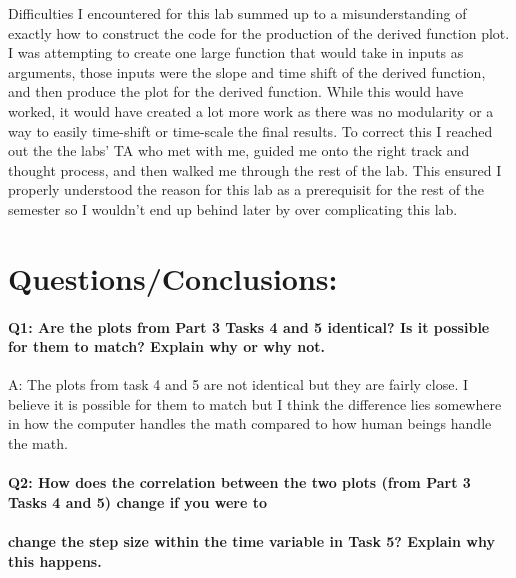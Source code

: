 \documentclass[11pt]{article}
\begin{document}
Difficulties I encountered for this lab summed up to a misunderstanding
of exactly how to construct the code for the production of the derived
function plot. I was attempting to create one large function that would
take in inputs as arguments, those inputs were the slope and time shift
of the derived function, and then produce the plot for the derived
function. While this would have worked, it would have created a lot more
work as there was no modularity or a way to easily time-shift or
time-scale the final results. To correct this I reached out the the
labs' TA who met with me, guided me onto the right track and thought
process, and then walked me through the rest of the lab. This ensured I
properly understood the reason for this lab as a prerequisit for the
rest of the semester so I wouldn't end up behind later by over
complicating this lab.

    \hypertarget{questionsconclusions}{%
\section{Questions/Conclusions:}\label{questionsconclusions}}

\hypertarget{q1-are-the-plots-from-part-3-tasks-4-and-5-identical-is-it-possible-for-them-to-match-explain-why-or-why-not.}{%
\paragraph{Q1: Are the plots from Part 3 Tasks 4 and 5 identical? Is it
possible for them to match? Explain why or why
not.}\label{q1-are-the-plots-from-part-3-tasks-4-and-5-identical-is-it-possible-for-them-to-match-explain-why-or-why-not.}}

A: The plots from task 4 and 5 are not identical but they are fairly
close. I believe it is possible for them to match but I think the
difference lies somewhere in how the computer handles the math compared
to how human beings handle the math.

\hypertarget{q2-how-does-the-correlation-between-the-two-plots-from-part-3-tasks-4-and-5-change-if-you-were-to}{%
\paragraph{Q2: How does the correlation between the two plots (from Part
3 Tasks 4 and 5) change if you were
to}\label{q2-how-does-the-correlation-between-the-two-plots-from-part-3-tasks-4-and-5-change-if-you-were-to}}

\hypertarget{change-the-step-size-within-the-time-variable-in-task-5-explain-why-this-happens.}{%
\paragraph{change the step size within the time variable in Task 5?
Explain why this
happens.}\label{change-the-step-size-within-the-time-variable-in-task-5-explain-why-this-happens.}}
\end{document}
